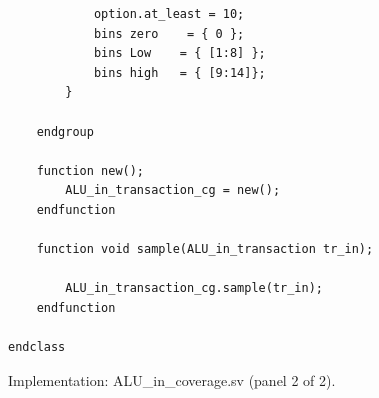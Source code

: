 \documentclass[11pt,a4paper]{article}
\begin{document}
\begin{figure}[!htbp]\begin{minipage}{\linewidth}\fontsize{10}{11.4}\selectfont\begin{verbatim}
            option.at_least = 10;
            bins zero    = { 0 };
            bins Low    = { [1:8] };
            bins high   = { [9:14]};
        }

    endgroup

    function new();
        ALU_in_transaction_cg = new();
    endfunction

    function void sample(ALU_in_transaction tr_in);

        ALU_in_transaction_cg.sample(tr_in);
    endfunction

endclass
\end{verbatim}\end{minipage}\caption{Implementation: ALU\_in\_coverage.sv (panel 2 of 2).}\end{figure}
\clearpage
\end{document}
